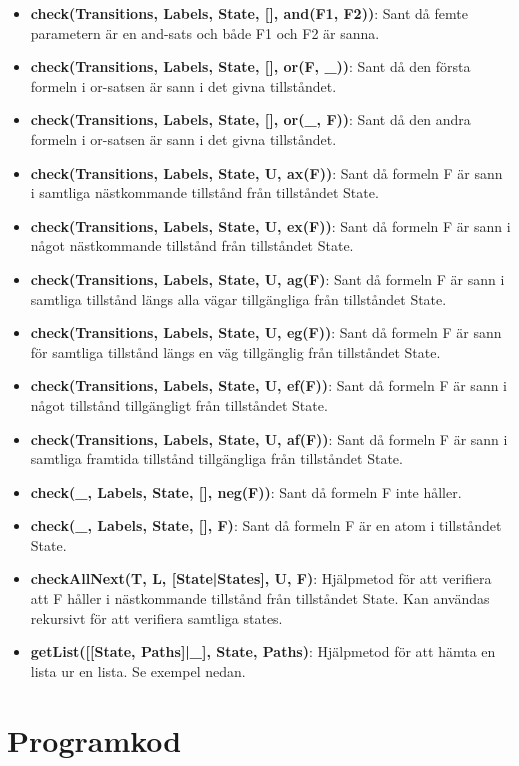 \documentclass{article}
\begin{document}
  \begin{itemize}

    \item \textbf{check(Transitions, Labels, State, [], and(F1, F2))}: Sant då
      femte parametern är en and-sats och både F1 och F2 är sanna.

    \item \textbf{check(Transitions, Labels, State, [], or(F, \_))}: Sant då
      den första formeln i or-satsen är sann i det givna tillståndet.

    \item \textbf{check(Transitions, Labels, State, [], or(\_, F))}: Sant då den
      andra formeln i or-satsen är sann i det givna tillståndet.

    \item \textbf{check(Transitions, Labels, State, U, ax(F))}: Sant då formeln
      F är sann i samtliga nästkommande tillstånd från tillståndet State.

    \item \textbf{check(Transitions, Labels, State, U, ex(F))}: Sant då formeln
      F är sann i något nästkommande tillstånd från tillståndet State.

    \item \textbf{check(Transitions, Labels, State, U, ag(F)}: Sant då formeln F
      är sann i samtliga tillstånd längs alla vägar tillgängliga från tillståndet
      State. 

    \item \textbf{check(Transitions, Labels, State, U, eg(F))}: Sant då formeln
      F är sann för samtliga tillstånd längs en väg tillgänglig från tillståndet
      State.

    \item \textbf{check(Transitions, Labels, State, U, ef(F))}: Sant då formeln
      F är sann i något tillstånd tillgängligt från tillståndet State.

    \item \textbf{check(Transitions, Labels, State, U, af(F))}: Sant då formeln
      F är sann i samtliga framtida tillstånd tillgängliga från tillståndet
      State.

    \item \textbf{check(\_, Labels, State, [], neg(F))}: Sant då formeln F inte
      håller.

    \item \textbf{check(\_, Labels, State, [], F)}: Sant då formeln F är en atom
      i tillståndet State.

    \item \textbf{checkAllNext(T, L, [State|States], U, F)}: Hjälpmetod för att
      verifiera att F håller i nästkommande tillstånd från tillståndet State.
      Kan användas rekursivt för att verifiera samtliga states.

    \item \textbf{getList([[State, Paths]|\_], State, Paths)}: Hjälpmetod för
      att hämta en lista ur en lista. Se exempel nedan.
  \end{itemize}

  \section{Programkod}
  
\end{document}
